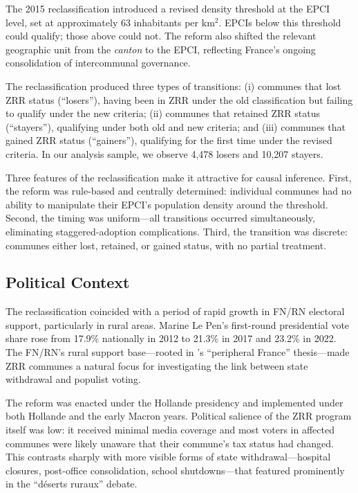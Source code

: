 \documentclass[12pt]{article}
\begin{document}
The 2015 reclassification introduced a revised density threshold at the EPCI level, set at approximately 63 inhabitants per km$^2$. EPCIs below this threshold could qualify; those above could not. The reform also shifted the relevant geographic unit from the \textit{canton} to the EPCI, reflecting France's ongoing consolidation of intercommunal governance.

The reclassification produced three types of transitions: (i) communes that lost ZRR status (``losers''), having been in ZRR under the old classification but failing to qualify under the new criteria; (ii) communes that retained ZRR status (``stayers''), qualifying under both old and new criteria; and (iii) communes that gained ZRR status (``gainers''), qualifying for the first time under the revised criteria. In our analysis sample, we observe 4,478 losers and 10,207 stayers.

Three features of the reclassification make it attractive for causal inference. First, the reform was rule-based and centrally determined: individual communes had no ability to manipulate their EPCI's population density around the threshold. Second, the timing was uniform---all transitions occurred simultaneously, eliminating staggered-adoption complications. Third, the transition was discrete: communes either lost, retained, or gained status, with no partial treatment.

\subsection{Political Context}

The reclassification coincided with a period of rapid growth in FN/RN electoral support, particularly in rural areas. Marine Le Pen's first-round presidential vote share rose from 17.9\% nationally in 2012 to 21.3\% in 2017 and 23.2\% in 2022. The FN/RN's rural support base---rooted in \citet{guilluy2014france}'s ``peripheral France'' thesis---made ZRR communes a natural focus for investigating the link between state withdrawal and populist voting.

The reform was enacted under the Hollande presidency and implemented under both Hollande and the early Macron years. Political salience of the ZRR program itself was low: it received minimal media coverage and most voters in affected communes were likely unaware that their commune's tax status had changed. This contrasts sharply with more visible forms of state withdrawal---hospital closures, post-office consolidation, school shutdowns---that featured prominently in the ``d\'{e}serts ruraux'' debate.
\end{document}
